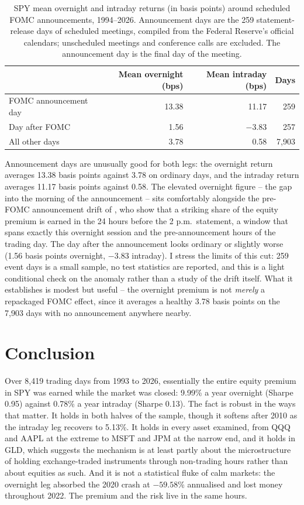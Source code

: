 \documentclass[11pt]{article}
\begin{document}
\begin{table}[t]
\centering
\caption{SPY mean overnight and intraday returns (in basis points) around scheduled FOMC announcements, 1994--2026. Announcement days are the 259 statement-release days of scheduled meetings, compiled from the Federal Reserve's official calendars; unscheduled meetings and conference calls are excluded. The announcement day is the final day of the meeting.}
\label{tab:fomc}
\begin{tabular}{lrrr}
\toprule
 & Mean overnight (bps) & Mean intraday (bps) & Days \\
\midrule
FOMC announcement day & 13.38 & 11.17 & 259 \\
Day after FOMC & 1.56 & $-3.83$ & 257 \\
All other days & 3.78 & 0.58 & 7,903 \\
\bottomrule
\end{tabular}
\end{table}

Announcement days are unusually good for both legs: the overnight return averages 13.38 basis points against 3.78 on ordinary days, and the intraday return averages 11.17 basis points against 0.58. The elevated overnight figure -- the gap into the morning of the announcement -- sits comfortably alongside the pre-FOMC announcement drift of \citet{lucca2015}, who show that a striking share of the equity premium is earned in the 24 hours before the 2 p.m.\ statement, a window that spans exactly this overnight session and the pre-announcement hours of the trading day. The day after the announcement looks ordinary or slightly worse (1.56 basis points overnight, $-3.83$ intraday). I stress the limits of this cut: 259 event days is a small sample, no test statistics are reported, and this is a light conditional check on the anomaly rather than a study of the drift itself. What it establishes is modest but useful -- the overnight premium is not \emph{merely} a repackaged FOMC effect, since it averages a healthy 3.78 basis points on the 7,903 days with no announcement anywhere nearby.

\section{Conclusion}
\label{sec:conclusion}

Over 8,419 trading days from 1993 to 2026, essentially the entire equity premium in SPY was earned while the market was closed: 9.99\% a year overnight (Sharpe 0.95) against 0.78\% a year intraday (Sharpe 0.13). The fact is robust in the ways that matter. It holds in both halves of the sample, though it softens after 2010 as the intraday leg recovers to 5.13\%. It holds in every asset examined, from QQQ and AAPL at the extreme to MSFT and JPM at the narrow end, and it holds in GLD, which suggests the mechanism is at least partly about the microstructure of holding exchange-traded instruments through non-trading hours rather than about equities as such. And it is not a statistical fluke of calm markets: the overnight leg absorbed the 2020 crash at $-59.58$\% annualised and lost money throughout 2022. The premium and the risk live in the same hours.
\end{document}

